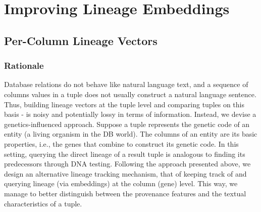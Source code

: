 \chapter{Improving Lineage Embeddings}
\label{chap:improving_lineage_embeddings}

\section{Per-Column Lineage Vectors}\label{sec:column-vectors}
\subsection{Rationale} Database relations do not behave like natural language text, and a sequence of columns values in a tuple does not usually construct a natural language sentence. Thus, building lineage vectors at the tuple level and comparing tuples on this basis - is noisy and potentially lossy in terms of information. Instead, we devise a genetics-influenced approach. Suppose a tuple represents the genetic code of an entity (a living organism in the DB world). The columns of an entity are its basic properties, i.e., the genes that combine to construct its genetic code. In this setting, querying the direct lineage of a result tuple is analogous to finding its predecessors through DNA testing. Following the approach presented above, we design an alternative lineage tracking mechanism, that of keeping track of and querying lineage (via embeddings) at the column (gene) level. This way, we manage to better distinguish between the provenance features and the textual characteristics of a tuple.\\ 

